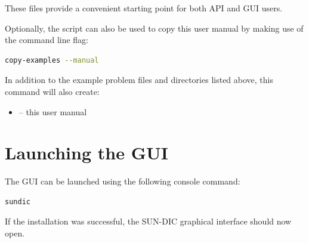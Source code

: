 \noindent
These files provide a convenient starting point for both API and GUI users.

Optionally, the  script can also be used to copy this user manual by making use of the  command line flag:

\begin{lstlisting}[language=bash]
copy-examples --manual
\end{lstlisting}

\noindent
In addition to the example problem files and directories listed above, this command will also create:

\begin{itemize}
	\item {} -- this user manual
\end{itemize}

\section{Launching the GUI}

The GUI can be launched using the following console command:

\begin{lstlisting}[language=bash]
sundic
\end{lstlisting}

\noindent
If the installation was successful, the SUN-DIC graphical interface should now open.
